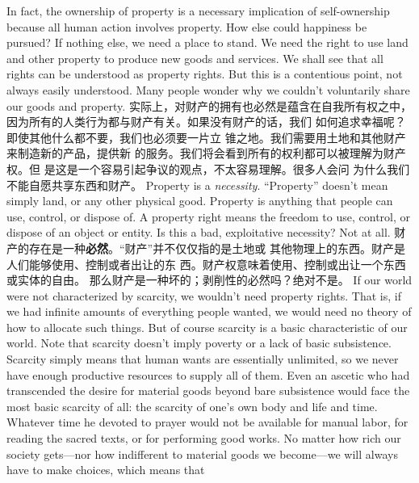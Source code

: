 \begin{paracol}{2}
In fact, the ownership of property is a necessary implication of
self-ownership because all human action involves property. How
else could happiness be pursued? If nothing else, we need a place
to stand. We need the right to use land and other property to
produce new goods and services. We shall see that all rights can be understood as property rights. But this is a contentious point,
not always easily understood. Many people wonder why we
couldn't voluntarily share our goods and property.
\switchcolumn
实际上，对财产的拥有也必然是蕴含在自我所有权之中，
因为所有的人类行为都与财产有关。如果没有财产的话，我们
如何追求幸福呢？即使其他什么都不要，我们也必须要一片立
锥之地。我们需要用土地和其他财产来制造新的产品，提供新
的服务。我们将会看到所有的权利都可以被理解为财产权。但
是这是一个容易引起争议的观点，不太容易理解。很多人会问
为什么我们不能自愿共享东西和财产。
\switchcolumn*
Property is a\textit{ necessity}. ``Property'' doesn't mean simply land,
or any other physical good. Property is anything that people
can use, control, or dispose of. A property right means the freedom to use, control, or dispose of an object or entity. Is this a
bad, exploitative necessity? Not at all.
\switchcolumn
财产的存在是一种\textbf{必然}。“财产”并不仅仅指的是土地或
其他物理上的东西。财产是人们能够使用、控制或者出让的东
西。财产权意味着使用、控制或出让一个东西或实体的自由。
那么财产是一种坏的；剥削性的必然吗？绝对不是。
\switchcolumn*
If our world were not characterized by scarcity, we wouldn't
need property rights. That is, if we had infinite amounts of
everything people wanted, we would need no theory of how to
allocate such things. But of course scarcity is a basic characteristic of our world. Note that scarcity doesn't imply poverty or a
lack of basic subsistence. Scarcity simply means that human
wants are essentially unlimited, so we never have enough productive resources to supply all of them. Even an ascetic who had
transcended the desire for material goods beyond bare subsistence would face the most basic scarcity of all: the scarcity of
one's own body and life and time. Whatever time he devoted to
prayer would not be available for manual labor, for reading the
sacred texts, or for performing good works. No matter how rich
our society gets---nor how indifferent to material goods we become---we will always have to make choices, which means that

\end{paracol}
